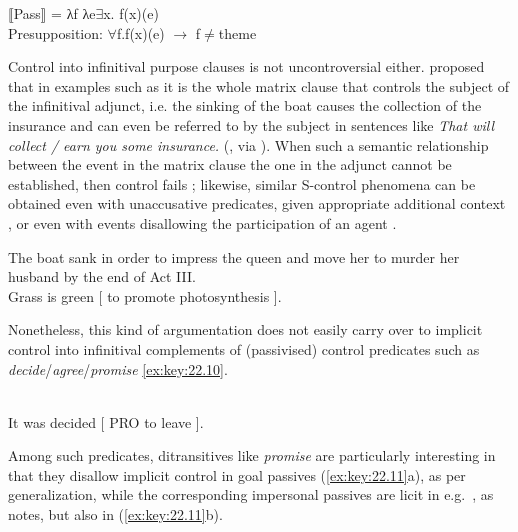 \documentclass[output=paper]{langsci/langscibook}
\begin{document}
\ea\label{ex:key:22.6}
    ⟦Pass⟧ = λf λe${\exists}$x. f(x)(e)\\
    Presupposition: ${\forall}$f.f(x)(e) $\to$ f${\neq}$theme
\z

Control into infinitival purpose clauses is not uncontroversial either.
\citet{Williams1985} proposed that in examples such as  it is
the whole matrix clause that controls the subject of the infinitival adjunct,
i.e.  the sinking of the boat causes the collection of the insurance and can
even be referred to by the subject in sentences like \emph{That will collect /
earn you some insurance.} (\citealt{Williams1985}, via
\citealt[573]{BhattPancheva2006}). When such a semantic relationship between
the event in the matrix clause the one in the adjunct cannot be established,
then control fails ; likewise, similar S-control phenomena can
be obtained even with unaccusative predicates, given
appropriate additional context , or even with events
disallowing the participation of an agent .

\label{ex:key:22.7}
\z
\ea\label{ex:key:22.8} The boat sank in order to impress the queen and move her
to murder her husband by the end of Act III.
\z
\ea\label{ex:key:22.9} \textcite{Williams1985}\\
    Grass is green [ to promote photosynthesis ].
\z

Nonetheless, this kind of argumentation does not easily carry over to implicit
control into infinitival complements of (passivised) control predicates such as
\emph{decide}/\emph{agree}/\emph{promise} \eqref{ex:key:22.10}.

\ea\label{ex:key:22.10} \textcite[4]{Landau2010}\\
    It was decided [ PRO to leave ].
\z

Among such predicates, ditransitives like \emph{promise} are particularly
interesting in that they disallow implicit control in goal passives
(\ref{ex:key:22.11}a), as per  generalization, while the
corresponding impersonal passives are licit in e.g.\ , as
\citet{vanUrk2013} notes, but also in 
(\ref{ex:key:22.11}b).\newpage

\ea\label{ex:key:22.11} \textcite{PitteroffSchafer2017}
    \z
\z
\end{document}
